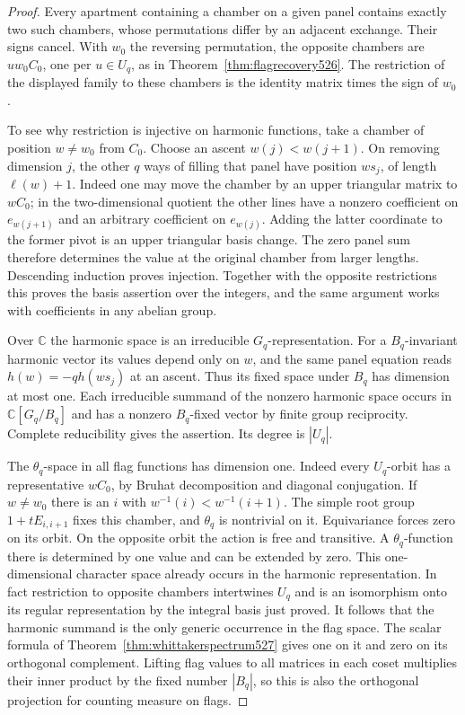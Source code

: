 \documentclass[a4paper,11pt]{article}
\theoremstyle{definition}
\theoremstyle{remark}
\numberwithin{equation}{section}
\begin{document}
\begin{proof}
Every apartment containing a chamber on a given panel contains exactly
two such chambers, whose permutations differ by an adjacent exchange.
Their signs cancel. With \(w_0\) the reversing permutation, the
opposite chambers are \(uw_0C_0\), one per \(u\in U_q\), as in
Theorem~\ref{thm:flagrecovery526}. The restriction of the displayed
family to these chambers is the identity matrix times the sign of
\(w_0\).

To see why restriction is injective on harmonic functions, take a
chamber of position \(w\ne w_0\) from \(C_0\). Choose an ascent
\(w(j)<w(j+1)\). On removing dimension \(j\), the other \(q\)
ways of filling that panel have position \(w s_j\), of length
\(\ell(w)+1\). Indeed one may move the chamber by an upper
triangular matrix to \(wC_0\); in the two-dimensional quotient the
other lines have a nonzero coefficient on \(e_{w(j+1)}\) and an
arbitrary coefficient on \(e_{w(j)}\). Adding the latter coordinate
to the former pivot is an upper triangular basis change.
The zero panel sum therefore determines the value at the original
chamber from larger lengths. Descending induction proves injection.
Together with the opposite restrictions this proves the basis
assertion over the integers, and the same argument works with
coefficients in any abelian group.

Over \(\mathbb C\) the harmonic space is an irreducible
\(G_q\)-representation. For a \(B_q\)-invariant harmonic vector its
values depend only on \(w\), and the same panel equation reads
\(h(w)=-q h(ws_j)\) at an ascent. Thus its fixed space under \(B_q\)
has dimension at most one. Each irreducible summand of the nonzero
harmonic space occurs in \(\mathbb C[G_q/B_q]\) and has a nonzero
\(B_q\)-fixed vector by finite group reciprocity. Complete
reducibility gives the assertion. Its degree is \(|U_q|\).

The \(\theta_q\)-space in all flag functions has dimension one.
Indeed every \(U_q\)-orbit has a representative \(wC_0\), by
Bruhat decomposition and diagonal conjugation. If \(w\ne w_0\)
there is an \(i\) with \(w^{-1}(i)<w^{-1}(i+1)\). The simple
root group \(1+tE_{i,i+1}\) fixes this chamber, and \(\theta_q\)
is nontrivial on it. Equivariance forces zero on its orbit.
On the opposite orbit the action is free and transitive. A
\(\theta_q\)-function there is determined by one value and can be
extended by zero. This one-dimensional character space already
occurs in the harmonic representation. In fact restriction to
opposite chambers intertwines \(U_q\) and is an isomorphism onto
its regular representation by the integral basis just proved.
It follows that the harmonic summand is the only generic occurrence
in the flag space. The scalar formula of
Theorem~\ref{thm:whittakerspectrum527} gives one on it and zero on
its orthogonal complement. Lifting flag values to all matrices in
each coset multiplies their inner product by the fixed number
\(|B_q|\), so this is also the orthogonal projection for counting
measure on flags.


\end{proof}
\end{document}
